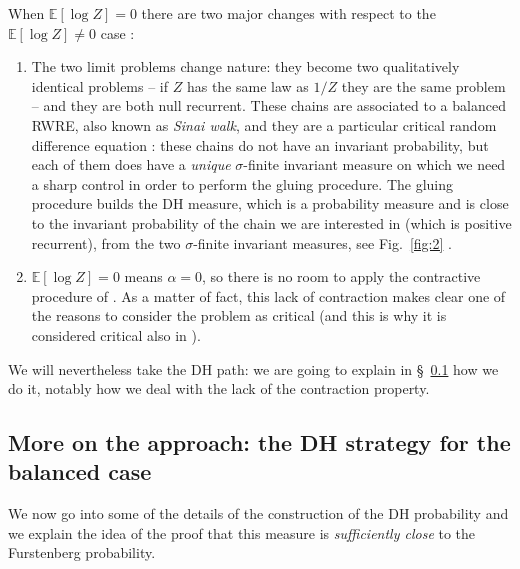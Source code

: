 \documentclass[reqno,11pt]{amsart}
\numberwithin{equation}{section}
\newcommand{\bbE}{{\ensuremath{\mathbb E}} }
\newcommand{\ga}{\alpha}
\newcommand{\gs}{\sigma}
\begin{document}
When $\bbE[\log Z]=0$ there are two major changes with respect to the $\bbE[\log Z]\neq 0$ case :
\smallskip

\begin{enumerate} [leftmargin=* ]
	\item The two limit problems change nature: they become two qualitatively identical problems -- if $Z$ has the same law as $1/Z$ they are the same problem -- and they are  both null recurrent. These chains are associated to a balanced RWRE, also known as \emph{Sinai walk}, and they are a particular critical random difference equation \cite{cf:BBE,cf:BBD}: 
  these chains do  not have an invariant probability, but each of them  does have a \emph{unique} $\gs$-finite invariant measure on which we need a sharp control in order to perform the gluing procedure.  The gluing procedure builds the 
  DH measure, which is a probability measure and is close to the invariant probability of the chain we are interested in (which is positive recurrent), from the two $\gs$-finite invariant measures, see Fig.~\ref{fig:2} .  
\item $\bbE[\log Z]=0$ means  $\ga=0$, so there is no room to apply the contractive procedure of \cite{cf:GGG}.  As a matter of  fact,  this 
lack of contraction makes clear one of the reasons to consider the 
problem as critical (and this is why it is considered critical also in \cite{cf:BBE,cf:BBD}). %
\end{enumerate}

\smallskip
We will nevertheless take the DH path: we are going to explain in  \S~\ref{sec:strategy} how we do it, notably how we deal with the lack of the contraction property.  
 
 

 


\subsection{More on the approach: the DH strategy for the balanced case}
\label{sec:strategy}
We now go into some of the details of the construction of the DH probability and we explain the idea of the proof that this measure is \emph{sufficiently close} to the Furstenberg probability. 
\end{document}
